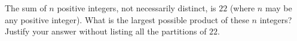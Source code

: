 The sum of $n$ positive integers, not necessarily distinct, is $22$ (where $n$ may be any positive integer). What is the largest possible product of these $n$ integers? Justify your answer without listing all the partitions of $22$.

